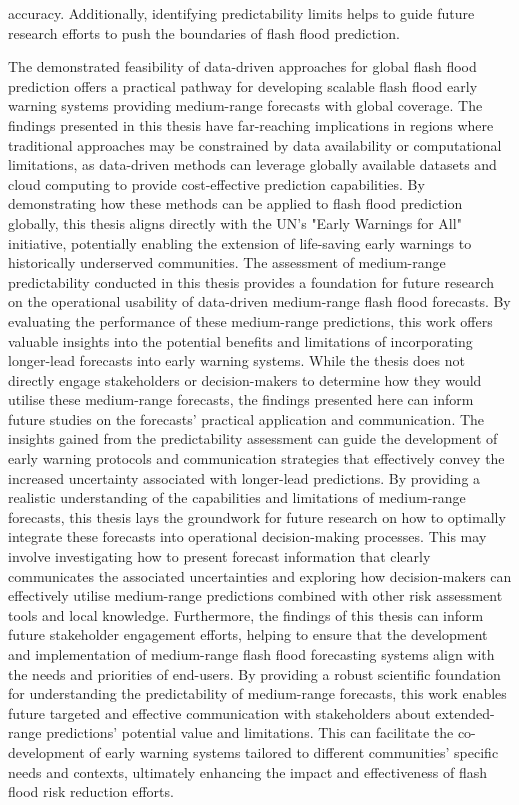 accuracy. Additionally, identifying predictability limits helps to guide future research efforts to push the boundaries of flash flood prediction.

The  demonstrated feasibility of data-driven approaches for global flash flood prediction offers a practical pathway for developing scalable flash flood early warning systems providing medium-range forecasts with global coverage. The findings presented in this thesis have far-reaching implications in regions where traditional approaches may be constrained by data availability or computational limitations, as data-driven methods can leverage globally available datasets and cloud computing to provide cost-effective prediction capabilities. By demonstrating how these methods can be applied to flash flood prediction globally, this thesis aligns directly with the UN's "Early Warnings for All" initiative, potentially enabling the extension of life-saving early warnings to historically underserved communities. The assessment of medium-range predictability conducted in this thesis provides a foundation for future research on the operational usability of data-driven medium-range flash flood forecasts. By evaluating the performance of these medium-range predictions, this work offers valuable insights into the potential benefits and limitations of incorporating longer-lead forecasts into early warning systems. While the thesis does not directly engage stakeholders or decision-makers to determine how they would utilise these medium-range forecasts, the findings presented here can inform future studies on the forecasts' practical application and communication. The insights gained from the predictability assessment can guide the development of early warning protocols and communication strategies that effectively convey the increased uncertainty associated with longer-lead predictions. By providing a realistic understanding of the capabilities and limitations of medium-range forecasts, this thesis lays the groundwork for future research on how to optimally integrate these forecasts into operational decision-making processes. This may involve investigating how to present forecast information that clearly communicates the associated uncertainties and exploring how decision-makers can effectively utilise medium-range predictions combined with other risk assessment tools and local knowledge. Furthermore, the findings of this thesis can inform future stakeholder engagement efforts, helping to ensure that the development and implementation of medium-range flash flood forecasting systems align with the needs and priorities of end-users. By providing a robust scientific foundation for understanding the predictability of medium-range forecasts, this work enables future targeted and effective communication with stakeholders about extended-range predictions' potential value and limitations. This can facilitate the co-development of early warning systems tailored to different communities' specific needs and contexts, ultimately enhancing the impact and effectiveness of flash flood risk reduction efforts.

